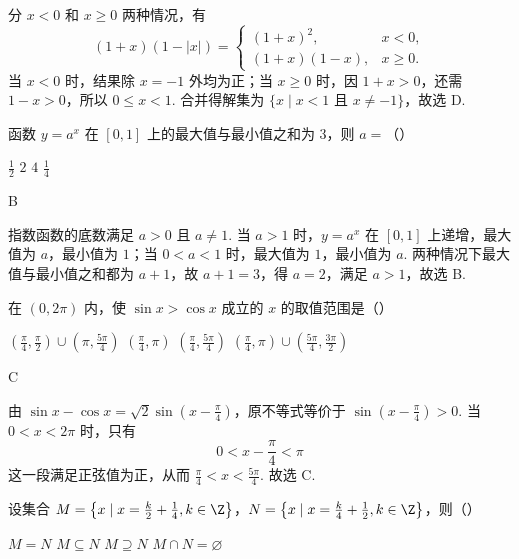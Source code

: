 \begin{solution}
分 \(x<0\) 和 \(x\geqslant0\) 两种情况，有
\[
(1+x)(1-|x|)=
\begin{cases}
(1+x)^{2},&x<0,\\
(1+x)(1-x),&x\geqslant0.
\end{cases}
\]
当 \(x<0\) 时，结果除 \(x=-1\) 外均为正；当 \(x\geqslant0\) 时，因 \(1+x>0\)，还需 \(1-x>0\)，所以 \(0\leqslant x<1\). 合并得解集为 \(\{x\mid x<1\text{ 且 }x\neq-1\}\)，故选 D.
\end{solution}

\begin{problem}
函数 \( y = a^x \) 在 \([0,1]\) 上的最大值与最小值之和为 \(3\)，则 \( a = \)（\quad）

\choices
    {\(\frac{1}{2}\)}
    {\(2\)}
    {\(4\)}
    {\(\frac{1}{4}\)}
\end{problem}

\begin{answer}
B
\end{answer}

\begin{solution}
指数函数的底数满足 \(a>0\) 且 \(a\neq1\). 当 \(a>1\) 时，\(y=a^{x}\) 在 \([0,1]\) 上递增，最大值为 \(a\)，最小值为 \(1\)；当 \(0<a<1\) 时，最大值为 \(1\)，最小值为 \(a\). 两种情况下最大值与最小值之和都为 \(a+1\)，故 \(a+1=3\)，得 \(a=2\)，满足 \(a>1\)，故选 B.
\end{solution}

\begin{problem}
在 \((0,2\pi)\) 内，使 \(\sin x > \cos x\) 成立的 \(x\) 的取值范围是（\quad）

\choices
    {\(\left(\frac{\pi}{4},\frac{\pi}{2}\right)\cup \left(\pi ,\frac{5\pi}{4}\right)\)}
    {\(\left(\frac{\pi}{4},\pi\right)\)}
    {\(\left(\frac{\pi}{4},\frac{5\pi}{4}\right)\)}
    {\(\left(\frac{\pi}{4},\pi\right) \cup \left(\frac{5\pi}{4},\frac{3\pi}{2}\right)\)}
\end{problem}

\begin{answer}
C
\end{answer}

\begin{solution}
由 \(\sin x-\cos x=\sqrt{2}\sin\left(x-\frac{\pi}{4}\right)\)，原不等式等价于 \(\sin\left(x-\frac{\pi}{4}\right)>0\). 当 \(0<x<2\pi\) 时，只有
\[
0<x-\frac{\pi}{4}<\pi
\]
这一段满足正弦值为正，从而 \(\frac{\pi}{4}<x<\frac{5\pi}{4}\). 故选 C.
\end{solution}

\begin{problem}
设集合 \(M = \left\{x \mid x = \frac{k}{2} + \frac{1}{4}, k \in \Z\right\}\)，\(N = \left\{x \mid x = \frac{k}{4} + \frac{1}{2}, k \in \Z\right\}\)，则（\quad）

\choices
    {\(M = N\)}
    {\(M \subseteq N\)}
    {\(M \supseteq N\)}
    {\(M \cap N = \varnothing\)}
\end{problem}

